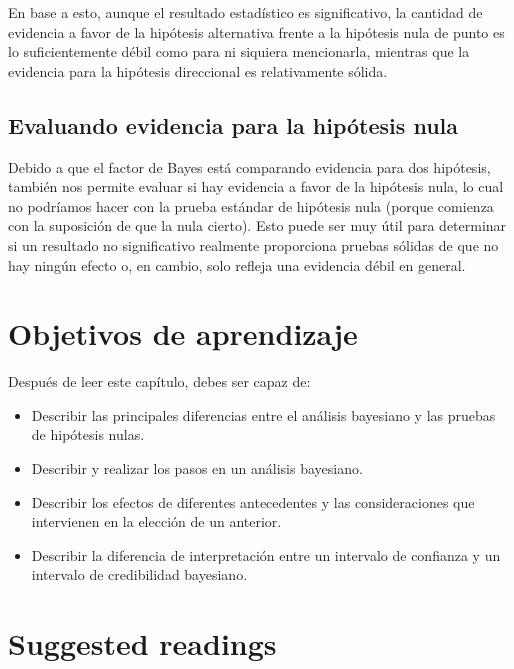 \documentclass[
  12pt,
]{book}
\providecommand{\tightlist}{%
  \setlength{\itemsep}{0pt}\setlength{\parskip}{0pt}}
\theoremstyle{definition}
\theoremstyle{definition}
\theoremstyle{definition}
\theoremstyle{remark}
\begin{document}
En base a esto, aunque el resultado estadístico es significativo, la cantidad de evidencia a favor de la hipótesis alternativa frente a la hipótesis nula de punto es lo suficientemente débil como para ni siquiera mencionarla, mientras que la evidencia para la hipótesis direccional es relativamente sólida.

\hypertarget{evaluando-evidencia-para-la-hipuxf3tesis-nula}{%
\subsection{Evaluando evidencia para la hipótesis nula}\label{evaluando-evidencia-para-la-hipuxf3tesis-nula}}

Debido a que el factor de Bayes está comparando evidencia para dos hipótesis, también nos permite evaluar si hay evidencia a favor de la hipótesis nula, lo cual no podríamos hacer con la prueba estándar de hipótesis nula (porque comienza con la suposición de que la nula cierto). Esto puede ser muy útil para determinar si un resultado no significativo realmente proporciona pruebas sólidas de que no hay ningún efecto o, en cambio, solo refleja una evidencia débil en general.

\hypertarget{objetivos-de-aprendizaje}{%
\section{Objetivos de aprendizaje}\label{objetivos-de-aprendizaje}}

Después de leer este capítulo, debes ser capaz de:

\begin{itemize}
\tightlist
\item
  Describir las principales diferencias entre el análisis bayesiano y las pruebas de hipótesis nulas.
\item
  Describir y realizar los pasos en un análisis bayesiano.
\item
  Describir los efectos de diferentes antecedentes y las consideraciones que intervienen en la elección de un anterior.
\item
  Describir la diferencia de interpretación entre un intervalo de confianza y un intervalo de credibilidad bayesiano.
\end{itemize}

\hypertarget{suggested-readings}{%
\section{Suggested readings}\label{suggested-readings}}
\end{document}
